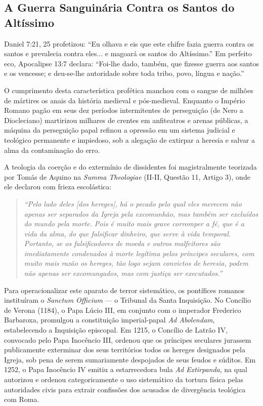 \documentclass[11pt,a4paper,openany]{book}
\begin{document}
\subsection{A Guerra Sanguinária Contra os Santos do Altíssimo}


Daniel 7:21, 25 profetizou: ``Eu olhava e eis que este chifre fazia guerra contra os santos e prevalecia contra eles... e magoará os santos do Altíssimo.'' Em perfeito eco, Apocalipse 13:7 declara: ``Foi-lhe dado, também, que fizesse guerra aos santos e os vencesse; e deu-se-lhe autoridade sobre toda tribo, povo, língua e nação.''

O cumprimento desta característica profética manchou com o sangue de milhões de mártires os anais da história medieval e pós-medieval. Enquanto o Império Romano pagão em seus dez períodos intermitentes de perseguição (de Nero a Diocleciano) martirizou milhares de crentes em anfiteatros e arenas públicas, a máquina da perseguição papal refinou a opressão em um sistema judicial e teológico permanente e impiedoso, sob a alegação de extirpar a heresia e salvar a alma da contaminação do erro.

A teologia da coerção e do extermínio de dissidentes foi magistralmente teorizada por Tomás de Aquino na \textit{Summa Theologiae} (II-II, Questão 11, Artigo 3), onde ele declarou com frieza escolástica:


\begin{quote}
\itshape ``Pelo lado deles [dos hereges], há o pecado pelo qual eles merecem não apenas ser separados da Igreja pela excomunhão, mas também ser excluídos do mundo pela morte. Pois é muito mais grave corromper a fé, que é a vida da alma, do que falsificar dinheiro, que serve à vida temporal. Portanto, se os falsificadores de moeda e outros malfeitores são imediatamente condenados à morte legítima pelos príncipes seculares, com muito mais razão os hereges, tão logo sejam convictos de heresia, podem não apenas ser excomungados, mas com justiça ser executados.''
\end{quote}


Para operacionalizar este aparato de terror sistemático, os pontífices romanos instituíram o \textit{Sanctum Officium} — o Tribunal da Santa Inquisição. No Concílio de Verona (1184), o Papa Lúcio III, em conjunto com o imperador Frederico Barbaroxa, promulgou a constituição imperial-papal \textit{Ad Abolendam}, estabelecendo a Inquisição episcopal. Em 1215, o Concílio de Latrão IV, convocado pelo Papa Inocêncio III, ordenou que os príncipes seculares jurassem publicamente exterminar dos seus territórios todos os hereges designados pela Igreja, sob pena de serem sumariamente despojados de seus feudos e súditos. Em 1252, o Papa Inocêncio IV emitiu a estarrecedora bula \textit{Ad Extirpanda}, na qual autorizou e ordenou categoricamente o uso sistemático da tortura física pelas autoridades civis para extrair confissões dos acusados de divergência teológica com Roma.
\end{document}
